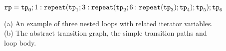 \begin{figure}
\begin{subfigure}{.48\textwidth}
\begin{centering}
    \caption{}
    \end{centering}
    \end{subfigure}
    $\mathtt{rp} = \mathtt{tp}_0; 1: \mathtt{repeat}(\mathtt{tp}_1; 3: {\mathtt{repeat}(\mathtt{tp}_2; 6 : {\mathtt{repeat}(\mathtt{tp}_3)}; \mathtt{tp}_4)}; \mathtt{tp}_5);\mathtt{tp}_6$
    \caption{
        (a) An example of three nested loops with related iterator variables.
        (b) The abstract transition graph, the simple transition paths and loop body.}
            \label{fig:threeWhile-overview}
        \end{figure}